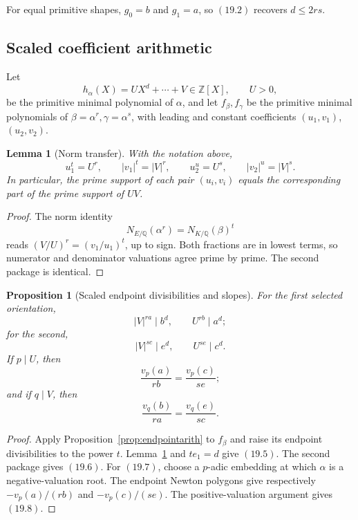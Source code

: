 \documentclass[11pt]{article}
\newtheorem{proposition}[theorem]{Proposition}
\newtheorem{lemma}[theorem]{Lemma}
\theoremstyle{definition}
\newcommand{\Q}{\mathbb Q}
\newcommand{\Z}{\mathbb Z}
\begin{document}
For equal primitive shapes, \(g_0=b\) and \(g_1=a\), so \((19.2)\)
recovers \(d\leq2rs\).

\subsection{Scaled coefficient arithmetic}

Let
\[
 h_\alpha(X)=UX^d+\cdots+V\in\Z[X],\qquad U>0,
\]
be the primitive minimal polynomial of \(\alpha\), and let
\(f_\beta,f_\gamma\) be the primitive minimal polynomials of
\(\beta=\alpha^r,\gamma=\alpha^s\), with leading and constant
coefficients \((u_1,v_1)\), \((u_2,v_2)\).

\begin{lemma}[Norm transfer]\label{lem:normtransfer}
With the notation above,
\begin{equation}
 u_1^t=U^r,\qquad |v_1|^t=|V|^r,
 \qquad
 u_2^u=U^s,\qquad |v_2|^u=|V|^s.
 \tag{19.4}
\end{equation}
In particular, the prime support of each pair \((u_i,v_i)\) equals the
corresponding part of the prime support of \(UV\).
\end{lemma}

\begin{proof}
The norm identity
\[
 N_{E/\Q}(\alpha^r)=N_{K/\Q}(\beta)^t
\]
reads
\((V/U)^r=(v_1/u_1)^t\), up to sign.  Both fractions are in lowest terms,
so numerator and denominator valuations agree prime by prime.  The second
package is identical.
\end{proof}

\begin{proposition}[Scaled endpoint divisibilities and slopes]
\label{prop:scaledendpoint}
For the first selected orientation,
\begin{equation}
 |V|^{ra}\mid b^d,\qquad U^{rb}\mid a^d;
 \tag{19.5}
\end{equation}
for the second,
\begin{equation}
 |V|^{sc}\mid e^d,\qquad U^{se}\mid c^d.
 \tag{19.6}
\end{equation}
If \(p\mid U\), then
\begin{equation}
 \frac{v_p(a)}{rb}=\frac{v_p(c)}{se};
 \tag{19.7}
\end{equation}
and if \(q\mid V\), then
\begin{equation}
 \frac{v_q(b)}{ra}=\frac{v_q(e)}{sc}.
 \tag{19.8}
\end{equation}
\end{proposition}

\begin{proof}
Apply Proposition~\ref{prop:endpointarith} to \(f_\beta\) and raise its
endpoint divisibilities to the power \(t\).  Lemma~\ref{lem:normtransfer}
and \(te_1=d\) give \((19.5)\).  The second package gives \((19.6)\).
For \((19.7)\), choose a \(p\)-adic embedding at which \(\alpha\) is a
negative-valuation root.  The endpoint Newton polygons give respectively
\(-v_p(a)/(rb)\) and \(-v_p(c)/(se)\).  The positive-valuation argument
gives \((19.8)\).
\end{proof}
\end{document}
